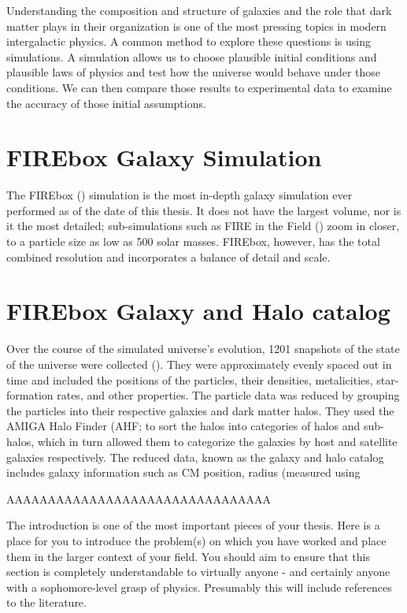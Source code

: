 Understanding the composition and structure of galaxies and the role that dark matter plays in their organization is one of the most pressing topics in modern intergalactic physics. A common method to explore these questions is using simulations. A simulation allows us to choose plausible initial conditions and plausible laws of physics and test how the universe would behave under those conditions. We can then compare those results to experimental data to examine the accuracy of those initial assumptions.

\section{FIREbox Galaxy Simulation}
The FIREbox (\cite{feldmann_firebox_2022}) simulation is the most in-depth galaxy simulation ever performed as of the date of this thesis. It does not have the largest volume, nor is it the most detailed; sub-simulations such as FIRE in the Field (\cite{fitts_fire_2017}) zoom in closer, to a particle size as low as 500 solar masses. FIREbox, however, has the total combined resolution and incorporates a balance of detail and scale.




\section{FIREbox Galaxy and Halo catalog}
Over the course of the simulated universe's evolution, 1201 snapshots of the state of the universe were collected (\cite{feldmann_firebox_2022}). They were approximately evenly spaced out in time and included the positions of the particles, their densities, metalicities, star-formation rates, and other properties. The particle data was reduced by grouping the particles into their respective galaxies and dark matter halos. They used the AMIGA Halo Finder (AHF; \cite{knollmann_ahf_2009} to sort the halos into categories of halos and sub-halos, which in turn allowed them to categorize the galaxies by host and satellite galaxies respectively. The reduced data, known as the galaxy and halo catalog includes galaxy information such as CM position, radius (measured using 

AAAAAAAAAAAAAAAAAAAAAAAAAAAAAAAA

The introduction is one of the most important pieces of your thesis.  Here is a place for you to introduce the problem(s) on which you have worked and place them in the larger context of your field.  You should aim to ensure that this section is completely understandable to virtually anyone - and certainly anyone with a sophomore-level grasp of physics.  Presumably this will include references to the literature.

